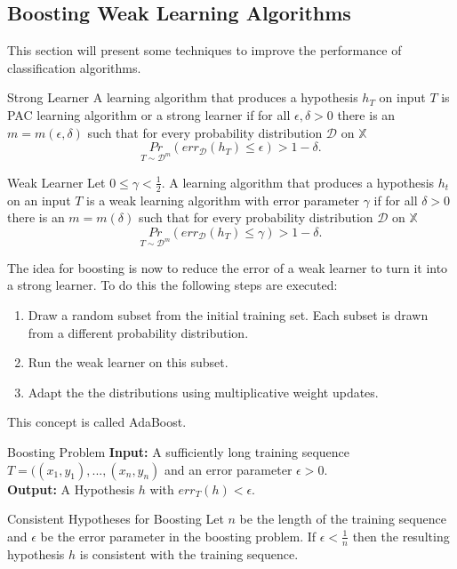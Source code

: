 \documentclass{panikzettel}
\begin{document}

\subsection{Boosting Weak Learning Algorithms}
This section will present some techniques to improve the performance of classification algorithms.

\begin{defi}{Strong Learner}
A learning algorithm that produces a hypothesis $h_T$ on input $T$ is PAC learning algorithm or a strong learner if for all $\epsilon,\delta>0$ there is an $m=m(\epsilon,\delta)$ such that for every probability distribution $\mathcal{D}$ on $\mathbb{X}$
\[
\underset{T\sim \mathcal{D}^m}{Pr} (err_\mathcal{D}(h_T)\leq \epsilon) > 1-\delta.
\]
\end{defi}

\begin{defi}{Weak Learner}
Let $0\leq \gamma<\frac{1}{2}$. A learning algorithm that produces a hypothesis $h_t$ on an input $T$ is a weak learning algorithm with error parameter $\gamma$ if for all $\delta > 0$ there is an $m=m(\delta)$ such that for every probability distribution $\mathcal{D}$ on $\mathbb{X}$
\[
\underset{T\sim \mathcal{D}^m}{Pr} (err_\mathcal{D}(h_T)\leq \gamma) > 1-\delta.
\]
\end{defi}

The idea for boosting is now to reduce the error of a weak learner to turn it into a strong learner. To do this the following steps are executed:
\begin{enumerate}
\item Draw a random subset from the initial training set. Each subset is drawn from a different probability distribution.
\item Run the weak learner on this subset.
\item Adapt the the distributions using multiplicative weight updates.
\end{enumerate}
This concept is called AdaBoost.

\begin{halfboxl}
\vspace{-\baselineskip}
\begin{defi}{Boosting Problem}
\textbf{Input:} A sufficiently long training sequence $T=((x_1,y_1),...,(x_n,y_n)$ and an error parameter $\epsilon>0$.\\
\textbf{Output:} A Hypothesis $h$ with $err_T(h)<\epsilon$.
\end{defi}
\end{halfboxl}
\begin{halfboxr}
\vspace{-\baselineskip}
\begin{theo}{Consistent Hypotheses for Boosting}
Let $n$ be the length of the training sequence and $\epsilon$ be the error parameter in the boosting problem. If $\epsilon<\frac{1}{n}$ then the resulting hypothesis $h$ is consistent with the training sequence.
\end{theo}
\end{halfboxr}
\end{document}
